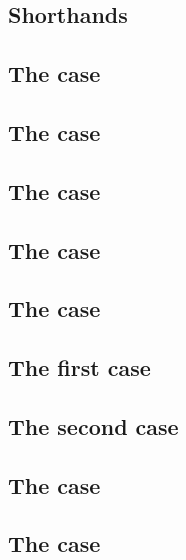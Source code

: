 \subsection{Shorthands                            \lispTodo{}}    \label{bls: specialized: shorthands}                
\subsection{The  case     \lispTodo{}}    \label{bls: specialized: pointevaluation}           
\subsection{The  case                 \lispTodo{}}    \label{bls: specialized: g1add}                      
\subsection{The  case                 \lispTodo{}}    \label{bls: specialized: g1msm}                      
\subsection{The  case                 \lispTodo{}}    \label{bls: specialized: g2add}                      
\subsection{The  case                 \lispTodo{}}    \label{bls: specialized: g2msm}                      
\subsection{The  first case  \lispTodo{}}    \label{bls: specialized: pairingcheck first}         
\subsection{The  second case \lispTodo{}}    \label{bls: specialized: pairingcheck second}        
\subsection{The  case       \lispTodo{}}    \label{bls: specialized: fptog1}                     
\subsection{The  case      \lispTodo{}}    \label{bls: specialized: fp2tog2}                    
